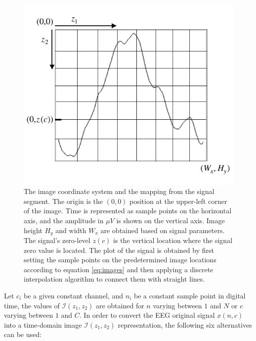 \begin{figure}[h!]
\centering
\includegraphics[scale=1.2]{images/imagecoordinatesystem.pdf}
\caption[Image Coordinate System]{The image coordinate system and the mapping from the signal segment.  The origin is the $(0,0)$ position at the upper-left corner of the image.  Time is represented as sample points on the horizontal axis, and the amplitude in $\mu V$ is shown on the vertical axis. Image height $H_y$ and width $W_x$ are obtained based on signal parameters.  The signal's zero-level $z(c)$ is the vertical location where the signal zero value is located. The plot of the signal is obtained by first setting the sample points on the predetermined image locations according to equation \ref{eq:images} and then applying a discrete interpolation algorithm to connect them with straight lines. }
\label{fig:imagecoordinatesystem}
\end{figure}


Let $c_i$ be a given constant channel, and $n_i$ be a constant sample point in digital time,  the values of $\mathcal{I}(z_1,z_2)$ are obtained for $n$ varying between $1$ and $N$ or $c$ varying between $1$ and $C$.   In order to convert the EEG original signal $x(n,c)$ into a time-domain image $\mathcal{I}(z_1,z_2)$ representation, the following six alternatives can be used:

